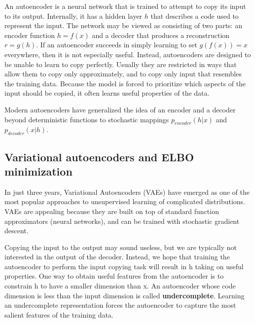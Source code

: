 An autoencoder is a neural network that is trained to attempt to copy its input to its output. Internally, it has a hidden layer $h$ that describes a code used to represent the input. The network may be viewed as consisting of two parts: an encoder function $h=f(x)$ and a decoder that produces a reconstruction $r=g(h)$. If an autoencoder succeeds in simply learning to set $g(f(x))=x$ everywhere, then it is not especially useful. Instead, autoencoders are designed to be unable to learn to copy perfectly. Usually they are restricted in ways that allow them to copy only approximately, and to copy only input that resembles the training data. Because the model is forced to prioritize which aspects of the input should be copied, it often learns useful properties of the data.
%


Modern autoencoders have generalized the idea of an encoder and a decoder beyond deterministic functions to stochastic mappings $p_{encoder}(h | x)$ and $p_{decoder}(x | h)$.


\subsection{Variational autoencoders and ELBO minimization}

In just three years, Variational Autoencoders (VAEs) have emerged as one of the most popular approaches to unsupervised learning of complicated distributions. VAEs are appealing because they are built on top of standard function approximators (neural networks), and can be trained with stochastic gradient descent.

Copying the input to the output may sound useless, but we are typically not interested in the output of the decoder. Instead, we hope that training the autoencoder to perform the input copying task will result in h taking on useful properties. One way to obtain useful features from the autoencoder is to constrain h to have a smaller dimension than x. An autoencoder whose code dimension is less than the input dimension is called \textbf{undercomplete}. Learning an undercomplete representation forces the autoencoder to capture the most salient features of the training data.







